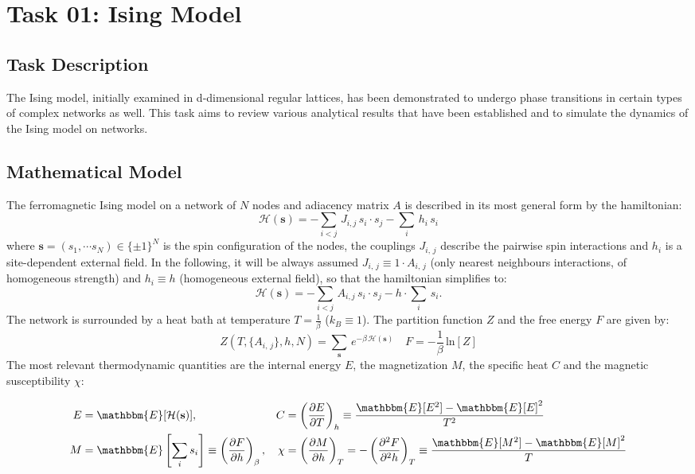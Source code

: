 \chapter{Task 01: Ising Model}
\section{Task Description}
The Ising model, initially examined in d-dimensional regular lattices, has been demonstrated to undergo phase transitions in certain types of complex networks as well. This task aims to review various analytical results that have been established \cite{crit_fen_review} and to simulate the dynamics of the Ising model on networks.
\section{Mathematical Model}
The ferromagnetic Ising model on a network of $N$ nodes and adiacency matrix $A$ is described in its most general form by the hamiltonian:
\begin{equation*}
    \mathcal{H}(\mathbf{s}) = - \sum_{i < j}\, J_{i,j}\,s_i\cdot s_j - \sum_{i}\, h_i\,s_i
\end{equation*}
where $\mathbf{s} = (s_1, \cdots s_N) \in \{\pm 1\}^N$ is the spin configuration of the nodes, the couplings $J_{i,\,j}$ describe the pairwise spin interactions and $h_i$ is a site-dependent external field.
In the following, it will be always assumed $J_{i,\,j} \equiv 1\cdot A_{i,\,j}$ (only nearest neighbours interactions, of homogeneous strength) and $h_i \equiv h$ (homogeneous external field), so that the hamiltonian simplifies to:
\begin{equation}
        \mathcal{H}(\mathbf{s}) = - \sum_{i < j}\, A_{i,j}\,s_i\cdot s_j - h\cdot \sum_{i}\,s_i.
        \label{eq:ising_hamiltonian}
\end{equation}
The network is surrounded by a heat bath at temperature $T = \frac{1}{\beta} $ ($k_B \equiv 1$). The partition function $Z$ and the free energy $F$ are given by:
\begin{equation*}
    Z\left(T, \{A_{i,\,j}\}, h, N\right) = \sum_{\mathbf{s}}\, e^{-\beta\, \mathcal{H}(\mathbf{s})} \quad F = -\frac{1}{\beta}\, \text{ln}[Z]
\end{equation*}
The most relevant thermodynamic quantities are the internal energy $E$, the magnetization $M$, the specific heat $C$ and the magnetic susceptibility $\chi$:

\begin{align*}
E &= \mathbbm{E}[\mathcal{H}(\mathbf{s})], &
C &= \left( \frac{\partial E}{\partial T} \right)_{h} \equiv \frac{\mathbbm{E}[E^2] - \mathbbm{E}[E]^2}{T^2} \\
M &= \mathbbm{E}\left[\sum_{i} s_i \right] \equiv \left( \frac{\partial F}{\partial h} \right)_{\beta}, &
\chi &= \left( \frac{\partial M}{\partial h} \right)_{T} = -\left( \frac{\partial^2 F}{\partial^2 h} \right)_{T} \equiv \frac{\mathbbm{E}[M^2] - \mathbbm{E}[M]^2}{T}
\end{align*}


